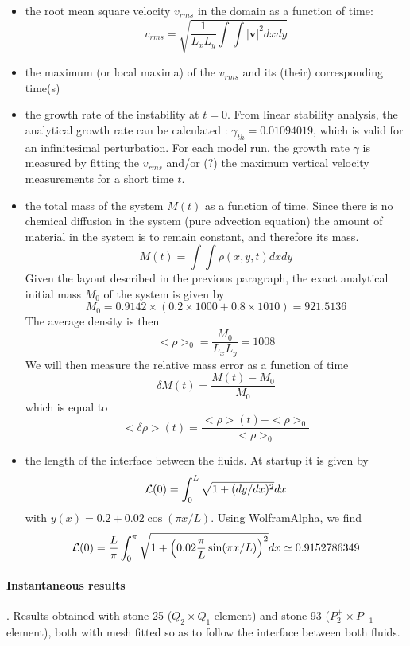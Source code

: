 \begin{itemize}

\item the root mean square velocity $v_{rms}$ in the domain as a function of time:
\begin{equation}
v_{rms}= \sqrt{ \frac{1}{L_xL_y} \int \int |{\bm v}|^2 dxdy}
\end{equation}

\item the maximum (or local maxima) of the $v_{rms}$ and its (their) corresponding time(s)

\item the growth rate of the instability at $t=0$.
From linear stability analysis, the analytical growth rate can be calculated \cite{ramb68,ramb81}: 
$\gamma_{th}=0.01094019$, which is valid for an infinitesimal perturbation. 
For each model run, the growth rate $\gamma$ is measured by fitting the $v_{rms}$ and/or (?) the maximum 
vertical velocity measurements for a short time $t$. 

\item the total mass of the system $M(t)$ as a function of time. Since there is no chemical diffusion in the 
system (pure advection equation) the amount of material in the system is to remain constant, and 
therefore its mass.
\begin{equation}
M(t) = \int \int \rho(x,y,t) dxdy
\end{equation}
Given the layout described in the previous paragraph, the exact analytical initial mass $M_0$ of the system 
is given by 
\[
M_0=0.9142 \times (0.2 \times 1000 + 0.8\times 1010) = 921.5136
\]
The average density is then 
\[
<\rho>_0=\frac{M_0}{L_xL_y} = 1008
\]
We will then measure the relative mass error as a function of time
\[
\delta M(t) = \frac{M(t)-M_0}{M_0}
\]
which is equal to 
\[
<\delta\rho>(t) = \frac{<\rho>(t)-<\rho>_0}{<\rho>_0}
\]

\item the length of the interface between the fluids. At startup it is given by 
\[
{\cal L}(0) = \int_0^L \sqrt{1 + (dy/dx)^2} dx
\]
with $y(x)=0.2+0.02\cos(\pi x/L)$. Using WolframAlpha, we find
\[
{\cal L}(0)= \frac{L}{\pi} \int_0^\pi \sqrt{1 + \left(0.02\frac{\pi}{L}\sin(\pi x /L) \right)^2} dx
\simeq 0.9152786349
\]

\end{itemize}




\paragraph{Instantaneous results}.
Results obtained with stone 25 ($Q_2\times Q_1$ element) 
and stone 93 ($P_2^+\times P_{-1}$ element), 
both with mesh fitted so as to follow the interface between both fluids.


